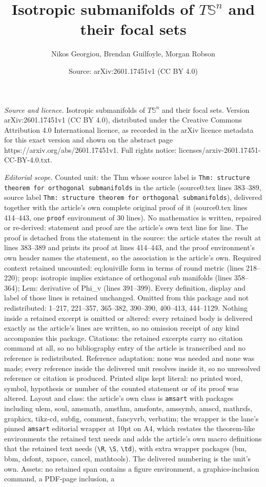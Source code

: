 \documentclass[10pt,a4paper]{amsart}
\title[Isotropic submanifolds of $T\mathbb{S}^n$ and their focal se]{Isotropic submanifolds of $T\mathbb{S}^n$ and their focal sets}
\author{Nikos Georgiou, Brendan Guilfoyle, Morgan Robson}
\date{Source: arXiv:2601.17451v1 (CC BY 4.0)}
\begin{document}
\maketitle

\noindent\emph{Source and licence.} Isotropic submanifolds of $T\mathbb{S}^n$ and their focal sets. Version arXiv:2601.17451v1 (CC BY 4.0), distributed under the Creative Commons Attribution 4.0 International licence, as recorded in the arXiv licence metadata for this exact version and shown on the abstract page https://arxiv.org/abs/2601.17451v1. Full rights notice: licenses/arxiv-2601.17451-CC-BY-4.0.txt.\par\smallskip

\noindent\textit{Editorial scope.} Counted unit: the Thm whose source label is \texttt{Thm: structure theorem for orthogonal submanifolds} in the article (source0.tex lines 383--389, source label \texttt{Thm: structure theorem for orthogonal submanifolds}), delivered together with the article's own complete original proof of it (source0.tex lines 414--443, one \texttt{proof} environment of 30 lines). No mathematics is written, repaired or re-derived: statement and proof are the article's own text line for line. The proof is detached from the statement in the source: the article states the result at lines 383--389 and prints its proof at lines 414--443, and the proof environment's own header names the statement, so the association is the article's own. Required context retained uncounted: eq:louiville form in terms of round metric (lines 218--220); prop: isotropic implies existance of orthogonal sub manifolds (lines 358--364); Lem: derivative of Phi\_v (lines 391--399). Every definition, display and label of those lines is retained unchanged. Omitted from this package and not redistributed: 1--217, 221--357, 365--382, 390--390, 400--413, 444--1129. Nothing inside a retained excerpt is omitted or altered: every retained body is delivered exactly as the article's lines are written, so no omission receipt of any kind accompanies this package. Citations: the retained excerpts carry no citation command at all, so no bibliography entry of the article is transcribed and no reference is redistributed. Reference adaptation: none was needed and none was made; every reference inside the delivered unit resolves inside it, so no unresolved reference or citation is produced. Printed slips kept literal: no printed word, symbol, hypothesis or number of the counted statement or of its proof was altered. Layout and class: the article's own class is \texttt{amsart} with packages including ulem, soul, amsmath, amsthm, amsfonts, amssymb, amscd, mathrsfs, graphicx, tikz-cd, subfig, comment, fancyvrb, verbatim; the wrapper is the lane's pinned \texttt{amsart} editorial wrapper at 10pt on A4, which restates the theorem-like environments the retained text needs and adds the article's own macro definitions that the retained text needs (\texttt{\textbackslash R}, \texttt{\textbackslash S}, \texttt{\textbackslash td}), with extra wrapper packages (bm, bbm, dsfont, xspace, cancel, mathtools). The delivered numbering is the unit's own. Assets: no retained span contains a figure environment, a graphics-inclusion command, a PDF-page inclusion, a 
\end{document}
